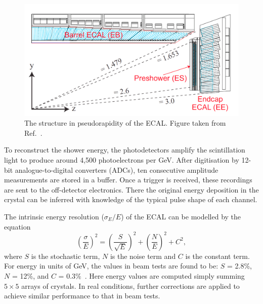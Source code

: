 \begin{figure}[h!]
  \centering
  \includegraphics[width=\textwidth]{Figures/Detector/ECALquadrant.png}
  \caption[The structure in pseudorapidity of the CMS ECAL.]
  {
    The structure in pseudorapidity of the ECAL.
    Figure taken from Ref.~\cite{ECALperformance}.
  }
  \label{fig:detector_ECALquadrant}
\end{figure}

To reconstruct the shower energy, the photodetectors amplify the scintillation light to produce around 4,500 photoelectrons per GeV.
After digitisation by 12-bit analogue-to-digital converters (ADCs), ten consecutive amplitude measurements are stored in a buffer.
Once a trigger is received, these recordings are sent to the off-detector electronics. 
There the original energy deposition in the crystal can be inferred with knowledge of the typical pulse shape of each channel.

The intrinsic energy resolution ($\sigma_E/E$) of the ECAL can be modelled by the equation
\begin{equation}
  \left(\frac{\sigma}{E} \right)^{2} =  
  \left(\frac{S}{\sqrt{E}} \right)^{2} +  
  \left(\frac{N}{E} \right)^{2} +  
  C^{2},
\label{eq:detector_resolution}
\end{equation}
where $S$ is the stochastic term, $N$ is the noise term and $C$ is the constant term.
For energy in units of GeV, the values in beam tests are found to be: %
$S$ = 2.8\%, $N$ = 12\%, and $C$ = 0.3\%~\cite{CMSdetector}.
Here energy values are computed simply summing $5\times5$ arrays of crystals.
In real conditions, further corrections are applied to achieve similar performance to that in beam tests.

